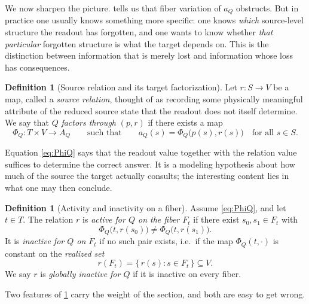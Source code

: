 \documentclass[11pt,reqno]{amsart}
\theoremstyle{plain}
\theoremstyle{definition}
\newtheorem{definition}[theorem]{Definition}
\newcommand{\Src}{S}
\newcommand{\Rdt}{T}
\begin{document}
We now sharpen the picture.  tells us that fiber variation of $a_Q$
obstructs. But in practice one usually knows something more specific: one knows \emph{which}
source-level structure the readout has forgotten, and one wants to know whether \emph{that
particular} forgotten structure is what the target depends on. This is the distinction between
information that is merely lost and information whose loss has consequences.

\begin{definition}[Source relation and its target factorization]\label{def:relation}
Let $r\colon\Src\to V$ be a map, called a \emph{source relation}, thought of as recording some
physically meaningful attribute of the reduced source state that the readout does not itself
determine. We say that $Q$ \emph{factors through} $(p,r)$ if there exists a map
\begin{equation}\label{eq:PhiQ}
\Phi_Q\colon \Rdt\times V\longrightarrow A_Q
\qquad\text{such that}\qquad
a_Q(s)=\Phi_Q\bigl(p(s),r(s)\bigr)\quad\text{for all }s\in\Src.
\end{equation}
\end{definition}

Equation \eqref{eq:PhiQ} says that the readout value together with the relation value suffices to
determine the correct answer. It is a modeling hypothesis about how much of the source the target
actually consults; the interesting content lies in what one may then conclude.

\begin{definition}[Activity and inactivity on a fiber]\label{def:active}
Assume \eqref{eq:PhiQ}, and let $t\in\Rdt$. The relation $r$ is \emph{active for $Q$ on the fiber
$F_t$} if there exist $s_0,s_1\in F_t$ with
\begin{equation}\label{eq:active}
\Phi_Q\bigl(t,r(s_0)\bigr)\neq\Phi_Q\bigl(t,r(s_1)\bigr).
\end{equation}
It is \emph{inactive for $Q$ on $F_t$} if no such pair exists, i.e.\ if the map
$\Phi_Q(t,\cdot)$ is constant on the \emph{realized set}
\begin{equation}\label{eq:realized}
r(F_t)=\{\, r(s) : s\in F_t \,\}\subseteq V .
\end{equation}
We say $r$ is \emph{globally inactive for $Q$} if it is inactive on every fiber.
\end{definition}

Two features of \cref{def:active} carry the weight of the section, and both are easy to get
wrong.
\end{document}
